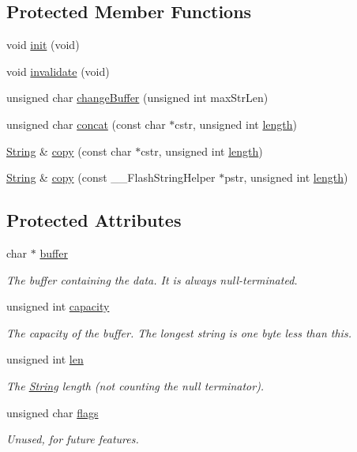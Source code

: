 \subsection*{Protected Member Functions}
\begin{DoxyCompactItemize}
\item 
void \hyperlink{class_string_af597f6dc5a6a96d14d5409b48254b8fb}{init} (void)
\item 
void \hyperlink{class_string_a9bee9137075d66b2af742969cb7549d9}{invalidate} (void)
\item 
unsigned char \hyperlink{class_string_aea30ddc42b0dd5434d23606c39580e5d}{change\+Buffer} (unsigned int max\+Str\+Len)
\item 
unsigned char \hyperlink{class_string_aba57d3370c8e6abc90b359d62ecb6be6}{concat} (const char $\ast$cstr, unsigned int \hyperlink{class_string_a21691d4bac5ec852977018fef6fb9c8a}{length})
\item 
\hyperlink{class_string}{String} \& \hyperlink{class_string_a0ef9e2f459577668c16326054d8220c8}{copy} (const char $\ast$cstr, unsigned int \hyperlink{class_string_a21691d4bac5ec852977018fef6fb9c8a}{length})
\item 
\hyperlink{class_string}{String} \& \hyperlink{class_string_a8d349a2f3cf3c8cde32f8665660aec20}{copy} (const \+\_\+\+\_\+\+Flash\+String\+Helper $\ast$pstr, unsigned int \hyperlink{class_string_a21691d4bac5ec852977018fef6fb9c8a}{length})
\end{DoxyCompactItemize}
\subsection*{Protected Attributes}
\begin{DoxyCompactItemize}
\item 
char $\ast$ \hyperlink{class_string_a7892a52a08b6671add931f85a19c1d46}{buffer}
\begin{DoxyCompactList}\small\item\em The buffer containing the data. It is always null-\/terminated. \end{DoxyCompactList}\item 
unsigned int \hyperlink{class_string_af78d6ba64d194d5571319316ee2c41d4}{capacity}
\begin{DoxyCompactList}\small\item\em The capacity of the buffer. The longest string is one byte less than this. \end{DoxyCompactList}\item 
unsigned int \hyperlink{class_string_add7c3370b556b8fd8c669b8c6b40043a}{len}
\begin{DoxyCompactList}\small\item\em The \hyperlink{class_string}{String} length (not counting the null terminator). \end{DoxyCompactList}\item 
unsigned char \hyperlink{class_string_a46d9dadfcefa61aa12563806c477657b}{flags}
\begin{DoxyCompactList}\small\item\em Unused, for future features. \end{DoxyCompactList}\end{DoxyCompactItemize}
